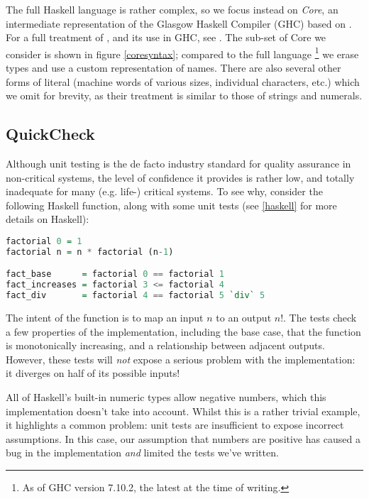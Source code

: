 The full Haskell language is rather complex, so we focus instead on \emph{Core}, an intermediate representation of the Glasgow Haskell Compiler (GHC) based on \fc. For a full treatment of \fc, and its use in GHC, see \citep[Appendix C]{sulzmann2007system}. The sub-set of Core we consider is shown in figure \ref{coresyntax}; compared to the full language \footnote{As of GHC version 7.10.2, the latest at the time of writing.} we erase types and use a custom representation of names. There are also several other forms of literal (machine words of various sizes, individual characters, etc.) which we omit for brevity, as their treatment is similar to those of strings and numerals.

\subsection{QuickCheck}

Although unit testing is the de facto industry standard for quality assurance in non-critical systems, the level of confidence it provides is rather low, and totally inadequate for many (e.g. life-) critical systems. To see why, consider the following Haskell function, along with some unit tests (see \ref{haskell} for more details on Haskell):

\begin{lstlisting}[language=Haskell, xleftmargin=.2\textwidth, xrightmargin=.2\textwidth]
factorial 0 = 1
factorial n = n * factorial (n-1)

fact_base      = factorial 0 == factorial 1
fact_increases = factorial 3 <= factorial 4
fact_div       = factorial 4 == factorial 5 `div` 5
\end{lstlisting}

The intent of the function is to map an input $n$ to an output $n!$. The tests check a few properties of the implementation, including the base case, that the function is monotonically increasing, and a relationship between adjacent outputs. However, these tests will \emph{not} expose a serious problem with the implementation: it diverges on half of its possible inputs!

All of Haskell's built-in numeric types allow negative numbers, which this implementation doesn't take into account. Whilst this is a rather trivial example, it highlights a common problem: unit tests are insufficient to expose incorrect assumptions. In this case, our assumption that numbers are positive has caused a bug in the implementation \emph{and} limited the tests we've written.

